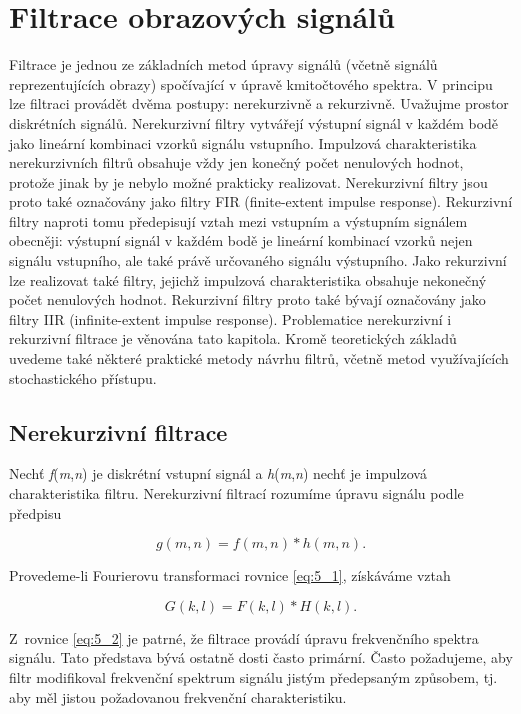 \chapter*{Filtrace obrazových signálů} \label{sec:filtrace}

Filtrace je jednou ze základních metod úpravy signálů (včetně signálů reprezentujících obrazy) spočívající v úpravě kmitočtového spektra. V principu lze filtraci provádět dvěma postupy: nerekurzivně a rekurzivně. Uvažujme prostor diskrétních signálů. Nerekurzivní filtry vytvářejí výstupní signál v každém bodě jako lineární kombinaci vzorků signálu vstupního. Impulzová charakteristika nerekurzivních filtrů obsahuje vždy jen konečný počet nenulových hodnot, protože jinak by je nebylo možné prakticky realizovat. Nerekurzivní filtry jsou proto také označovány jako filtry FIR (finite-extent impulse response). Rekurzivní filtry naproti tomu předepisují vztah mezi vstupním a výstupním signálem obecněji: výstupní signál v každém bodě je lineární kombinací vzorků nejen signálu vstupního, ale také právě určovaného signálu výstupního. Jako rekurzivní lze realizovat také filtry, jejichž impulzová charakteristika obsahuje nekonečný počet nenulových hodnot. Rekurzivní filtry proto také bývají označovány jako filtry IIR (infinite-extent impulse response). Problematice nerekurzivní i rekurzivní filtrace je věnována tato kapitola. Kromě teoretických základů uvedeme také některé praktické metody návrhu filtrů, včetně metod využívajících stochastického přístupu.

\section*{Nerekurzivní filtrace}

Nechť \textit{f}(\textit{m},\textit{n}) je diskrétní vstupní signál a \textit{h}(\textit{m},\textit{n}) nechť je impulzová charakteristika filtru. Nerekurzivní filtrací rozumíme úpravu signálu podle předpisu

\begin{equation} \label{eq:5_1}
    g(m, n) = f(m, n) * h(m, n).
\end{equation}

Provedeme-li Fourierovu transformaci rovnice \eqref{eq:5_1}, získáváme vztah

\begin{equation} \label{eq:5_2}
    G(k, l) = F(k, l) * H(k, l).
\end{equation}

Z~rovnice \eqref{eq:5_2} je patrné, že filtrace provádí úpravu frekvenčního spektra signálu. Tato představa bývá ostatně dosti často primární. Často požadujeme, aby filtr modifikoval frekvenční spektrum signálu jistým předepsaným způsobem, tj. aby měl jistou požadovanou frekvenční charakteristiku.

